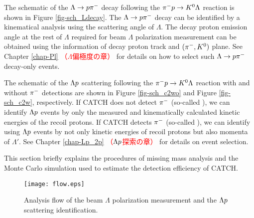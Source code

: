 The schematic of the $\Lambda\to p\pi^{-}$ decay following the $\pi^- p \to K^0 \Lambda$ reaction is shown in Figure \ref{fig-sch_Ldecay}. The $\Lambda\to p\pi^{-}$ decay can be identified by a kinematical analysis using the scattering angle of $\Lambda$. The decay proton emission angle at the rest of $\Lambda$ required for beam $\Lambda$ polarization measurement can be obtained using the information of decay proton track and $(\pi^-,K^0)$ plane. See Chapter \ref{chap-Pl} \textcolor{red}{（$\Lambda$偏極度の章）} for details on how to select such $\Lambda\to p\pi^{-}$ decay-only events.

The schematic of the $\Lambda p$ scattering following the $\pi^- p \to K^0 \Lambda$ reaction with and without $\pi^{-}$ detections are shown in Figure \ref{fig-sch_c2wo} and Figure \ref{fig-sch_c2w}, respectively. If CATCH does not detect $\pi^{-}$ (so-called ), we can identify $\Lambda p$ events by only the measured and kinematically calculated kinetic energies of the recoil protons. If CATCH detects $\pi^{-}$ (so-called ), we can identify using $\Lambda p$ events by not only kinetic energies of recoil protons but also momenta of $\Lambda'$. See Chapter \ref{chap-Lp_2p} \textcolor{red}{（$\Lambda p$探索の章）} for details on event selection.

This section briefly explains the procedures of missing mass analysis and the Monte Carlo simulation used to estimate the detection efficiency of CATCH.

\begin{figure}[!h]
  \begin{center}
    \texttt{[image: flow.eps]}
    \caption{Analysis flow of the beam $\Lambda$ polarization measurement and the $\Lambda p$ scattering identification.}
    \label{fig-flow}
  \end{center}
\end{figure}

